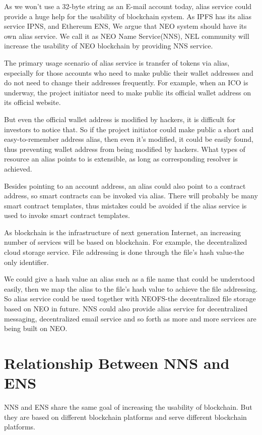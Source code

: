 \documentclass[letterpaper,10pt,english]{sphinxmanual}
\begin{document}
As we won’t use a 32-byte string as an E-mail account today, alias service could provide a huge help for the usability of blockchain system.
As IPFS has its alias service IPNS, and Ethereum ENS, We argue that NEO system should have its own alias service.
We call it as NEO Name Service(NNS), NEL community will increase the usability of NEO blockchain by providing NNS service.

The primary usage scenario of alias service is transfer of tokens via alias, especially for those accounts who need to make public their wallet addresses and do not need to change their addresses frequently.
For example, when an ICO is underway, the project initiator need to make public its official wallet address on its official website.

But even the official wallet address is modified by hackers, it is difficult for investors to notice that.
So if the project initiator could make public a short and easy-to-remember address alias, then even it’s modified, it could be easily found,
thus preventing wallet address from being modified by hackers.
What types of resource an alias points to is extensible, as long as corresponding resolver is achieved.

Besides pointing to an account address, an alias could also point to a contract address, so smart contracts can be invoked via alias.
There will probably be many smart contract templates, thus mistakes could be avoided if  the alias service is used to invoke smart contract templates.

As blockchain is the infrastructure of next generation Internet, an increasing number of services will be based on blockchain.
For example, the decentralized cloud storage service. File addressing is done through the file’s hash value-the only identifier.

We could give a hash value an alias such as a file name that could be understood easily, then we map the alias to the file’s hash value to achieve the file addressing.
So alias service could be used together with NEOFS-the decentralized file storage based on NEO in future. NNS could also provide alias service for decentralized messaging,
decentralized email service and so forth as more and more services are being built on NEO.


\section{Relationship Between NNS and ENS}
\label{\detokenize{nns_background:relationship-between-nns-and-ens}}
NNS and ENS share the same goal of increasing the usability of blockchain.
But they are based on different blockchain platforms and serve different blockchain platforms.
\end{document}
